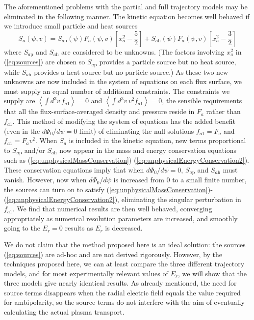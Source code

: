 \documentclass[12pt,superscriptaddress]{revtex4}
\newcommand{\Sap}{S_{a\mathrm{p}}}
\newcommand{\Sah}{S_{a\mathrm{h}}}
\begin{document}
The aforementioned problems with the partial and full trajectory models may be eliminated 
in the following manner.
The kinetic equation becomes well behaved if we introduce small particle and heat sources
\begin{equation}
S_a(\psi, v) = \Sap(\psi) F_{a}(\psi,v) \left[ x_a^2 - \frac{5}{2}\right] + \Sah(\psi) F_a(\psi, v) \left[x_a^2 - \frac{3}{2}\right]
\label{eq:sources}
\end{equation}
where $\Sap$ and $\Sah$ are considered to be unknowns.
(The factors involving $x_a^2$ in (\ref{eq:sources}) are chosen so $\Sap$ provides a particle source but no heat source, while $\Sah$ provides
a heat source but no particle source.)
As these two new unknowns are now included in the system of equations on each flux surface, we must supply an equal number of additional constraints.
The constraints we supply are $\left< \int d^3v\, f_{a1}\right>=0$ and $\left< \int d^3v\, v^2 f_{a1}\right>=0$,
the sensible requirements that all the flux-surface-averaged density and pressure reside in $F_a$ rather than $f_{a1}$.
This method of modifying the system of equations has the added benefit 
(even in the $d\Phi_0/d\psi=0$ limit)
of eliminating the null solutions $f_{a1} = F_a$ and $f_{a1} = F_a v^2$.
When $S_a$ is included in the kinetic equation, new terms proportional to $\Sap$ and/or $\Sah$
now appear in the mass and energy conservation equations such as (\ref{eq:unphysicalMassConservation})-(\ref{eq:unphysicalEnergyConservation2}).
These conservation equations imply that when $d\Phi_0/d\psi=0$, $\Sap$ and $\Sah$ must vanish.
However, now when $d\Phi_0/d\psi$ is increased from 0 to a small finite number, the sources can turn on
to satisfy  (\ref{eq:unphysicalMassConservation})-(\ref{eq:unphysicalEnergyConservation2}),
eliminating the singular perturbation in $f_{a1}$.  We find that numerical results are then well behaved,
converging appropriately as numerical resolution parameters are increased, and smoothly going to the
$E_r=0$ results as $E_r$ is decreased.

We do not claim that the method proposed here is an ideal solution: the sources (\ref{eq:sources})
are ad-hoc and are not derived rigorously. However, by the techniques proposed here, we can at least
compare the three different trajectory models, and for most experimentally relevant values of $E_r$, we will show
that the three models give nearly identical results. As already mentioned, the need for source terms disappears when the radial electric field equals the value required for ambipolarity, so the source terms do not interfere with the aim of eventually calculating the actual plasma transport. 
\end{document}

